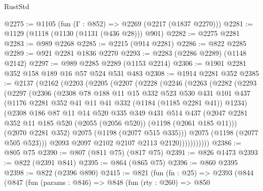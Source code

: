 \begin{lexlean}{RustStd}
\begin{coremodule}
{\begin{coremodule}
{{{{{{{{{@2275 := @1105 (fun (Γ : @852) => @2269 (@2217 (@1837 @2270)))
@2281 := @1129 (@1118 (@1130 (@1131 (@436 @28))) @901)
@2282 := @2275 @2281
@2283 := @989 @2268
@2285 := @2215 (@914 @2281)
@2286 := @822 @2285
@2289 := @921 @2281 @1836 @2270
@2293 := @2283 (@2286 @2289) (@1148 @2142)
@2297 := @989 @2285 @2289 (@1153 @2214)
@2306 := @1901 @2281 @352 @158 @189 @16 @57 @524 @531 @483
@2308 := @1914 @2281 @352
@2385 := @2137
    (@2162
      (@2203
        (@2205
          (@2207
            (@2228
              (@2246
                (@2263
                  (@2282
                    (@2293
                      (@2297
                        (@2306
                          (@2308
                            @78
                            @188
                            @11
                            @15
                            @332
                            @523
                            @530
                            @431
                            @101
                            @437
                            (@1176 @2281 @352 @41 @11 @41 @332 (@1184 (@1185 @2281 @41)) @1234)
                            (@2308
                              @186
                              @87
                              @11
                              @14
                              @520
                              @335
                              @349
                              @431
                              @514
                              @437
                              (@2047
                                @2281
                                @352
                                @11
                                @185
                                @520
                                (@2055 (@2056 @520))
                                (@1198 (@2061 @185 @11)))
                              (@2070 @2281 @352)
                              @2075
                              (@1198 (@2077 @515 @335)))
                            @2075
                            (@1198 (@2077 @505 @523)))
                          @2093
                          @2097
                          @2102
                          @2107
                          @2113
                          @2120)))))))))))
@2386 := @805 @75
@2390 := @807 (@811 @75) (@817 @75)
@2391 := @826 @1473
@2393 := @822 (@2391 @841)
@2395 := @864 (@865 @75)
@2396 := @860 @2395
@2398 := @822 (@2396 @890)
@2415 := @821
    (fun (fn : @25) =>
    @2393
      (@844
        (@847
          (fun (params : @846) =>
          @848
            (fun (rty : @260) =>
            @850
}}}}}}}}}
\end{coremodule}}
\end{coremodule}
\end{lexlean}
